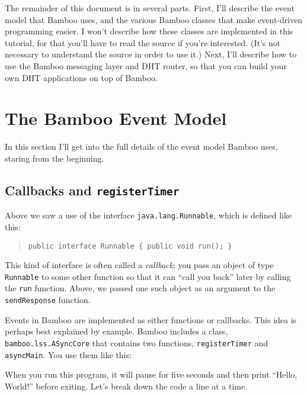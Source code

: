 \documentclass[11pt]{article}
\begin{document}
The remainder of this document is in several parts.  First, I'll
describe the event model that Bamboo uses, and the various Bamboo
classes that make event-driven programming easier.  I won't describe how
these classes are implemented in this tutorial, for that you'll have to
read the source if you're interested.  (It's not necessary to understand
the source in order to use it.)  Next, I'll describe how to use the
Bamboo messaging layer and DHT router, so that you can build your own
DHT applications on top of Bamboo.  

\section{The Bamboo Event Model}

In this section I'll get into the full details of the event model Bamboo
uses, staring from the beginning.

\subsection{Callbacks and \texttt{registerTimer}}

Above we saw a use of the interface \texttt{java.lang.Runnable}, which
is defined like this:
\begin{quote}
\lstset{language=Java, basicstyle=\small}
\begin{lstlisting}  
public interface Runnable { public void run(); }
\end{lstlisting}
\end{quote}
This kind of interface is often called a \emph{callback}; you pass an
object of type \texttt{Runnable} to some other function so that it can
``call you back'' later by calling the \texttt{run} function.  Above, we
passed one such object as an argument to the \texttt{sendResponse}
function.  

Events in Bamboo are implemented as either functions or callbacks.  This
idea is perhaps best explained by example.  Bamboo includes a class,
\texttt{bamboo.lss.ASyncCore} that contains two functions,
\texttt{registerTimer} and \texttt{asyncMain}.  You use them like this:

\begin{quote}
\lstset{language=Java, basicstyle=\small, numbers=left, numberstyle=\tiny, 
        numberfirstline=true, stepnumber=1, numbersep=5pt}

\end{quote}

When you run this program, it will pause for five seconds and then print
``Hello, World!'' before exiting.  Let's break down the code a line at a
time.  
\end{document}
